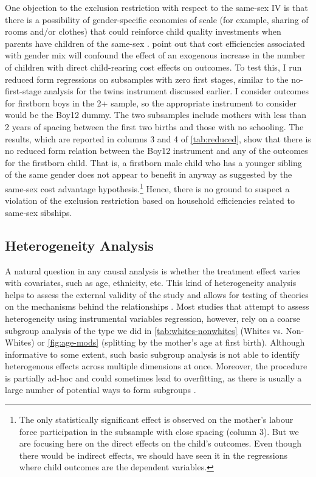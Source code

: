 One objection to the exclusion restriction with respect to the same-sex IV is that there is a possibility of gender-specific economies of scale (for example, sharing of rooms and/or clothes) that could reinforce child quality investments when parents have children of the same-sex \parencite{clarke_children_2018}. \textcite{rosenzweig_natural_2000} point out that cost efficiencies associated with gender mix will confound the effect of an exogenous increase in the number of children with direct child-rearing cost effects on outcomes. To test this, I run reduced form regressions on subsamples with zero first stages, similar to the no-first-stage analysis for the twins instrument discussed earlier. I consider outcomes for firstborn boys in the 2+ sample, so the appropriate instrument to consider would be the Boy12 dummy. The two subsamples include mothers with less than 2 years of spacing between the first two births and those with no schooling. The results, which are reported in columns 3 and 4 of \autoref{tab:reduced}, show that there is no reduced form relation between the Boy12 instrument and any of the outcomes for the firstborn child. That is, a firstborn male child who has a younger sibling of the same gender does not appear to benefit in anyway as suggested by the same-sex cost advantage hypothesis.\footnote{ The only statistically significant effect is observed on the mother's labour force participation in the subsample with close spacing (column 3). But we are focusing here on the direct effects on the child’s outcomes. Even though there would be indirect effects, we should have seen it in the regressions where child outcomes are the dependent variables. } Hence, there is no ground to suspect a violation of the exclusion restriction based on household efficiencies related to same-sex sibships. 


\subsection{Heterogeneity Analysis}

A natural question in any causal analysis is whether the treatment effect varies with covariates, such as age, ethnicity, etc. This kind of heterogeneity analysis helps to assess the external validity of the study and allows for testing of theories on the mechanisms behind the relationships \parencite[e.g.,][]{angrist_children_1998}. Most studies that attempt to assess heterogeneity using instrumental variables regression, however, rely on a coarse subgroup analysis of the type we did in \autoref{tab:whites-nonwhites} (Whites vs. Non-Whites) or \autoref{fig:age-mods} (splitting by the mother's age at first birth). Although informative to some extent, such basic subgroup analysis is not able to identify heterogenous effects across multiple dimensions at once. Moreover, the procedure is partially ad-hoc and could sometimes lead to overfitting, as there is usually a large number of potential ways to form subgroups \parencite{Chernozhukov2018}.

